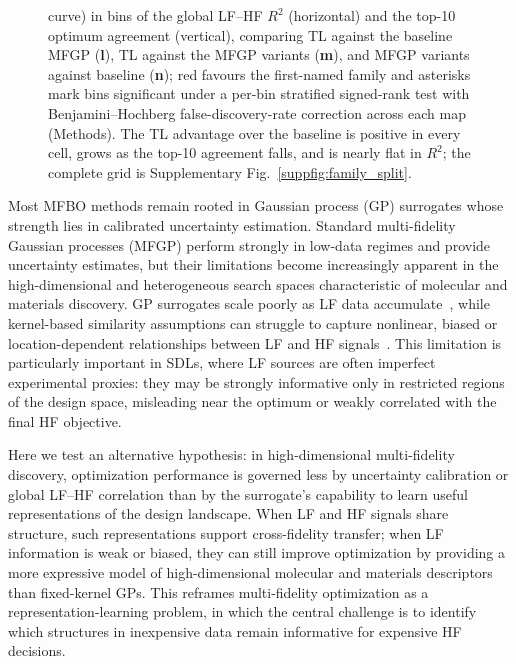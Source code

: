 \documentclass[11pt,a4paper]{article}%
\begin{document}
\begin{figure}[tp]
{curve) in bins of the global LF--HF $R^2$ (horizontal) and the top-10 optimum agreement
(vertical), comparing TL against the baseline MFGP (\textbf{l}), TL
against the MFGP variants (\textbf{m}), and MFGP variants against baseline
(\textbf{n}); red favours the first-named family and asterisks mark bins significant
under a per-bin stratified signed-rank test with Benjamini--Hochberg
false-discovery-rate correction across each map (Methods). The TL
advantage over the baseline is positive in every cell, grows as the top-10 agreement
falls, and is nearly flat in $R^2$; the complete grid is Supplementary
Fig.~\ref{suppfig:family_split}.}
\label{fig:overview}\label{fig:final_regret}\label{fig:family_heatmap}
\end{figure}

Most MFBO methods remain rooted in Gaussian process (GP) surrogates whose strength lies in calibrated uncertainty estimation. Standard multi-fidelity Gaussian processes (MFGP) perform strongly in low-data regimes and provide uncertainty estimates, but their limitations become increasingly apparent
 in the high-dimensional and heterogeneous search spaces characteristic of molecular and materials discovery.  GP surrogates scale poorly as LF data accumulate~\citep{williams2006gaussian}, while kernel-based similarity assumptions can struggle to capture nonlinear, biased or location-dependent relationships between LF and HF signals~\citep{snoek2015scalable, seeger2004gaussian, perdikaris2017nonlinear}. This limitation is particularly important in SDLs, where LF sources are often imperfect experimental proxies: they may be strongly informative only in restricted regions of the design space, misleading near the optimum or weakly correlated with the final HF objective.

Here we test an alternative hypothesis: in high-dimensional multi-fidelity discovery, optimization performance is governed less by uncertainty calibration or global LF--HF correlation than by the surrogate's capability to learn useful representations of the design landscape. When LF and HF signals share structure, such representations support cross-fidelity transfer; when LF information is weak or biased, they can still improve optimization by providing a more expressive model of high-dimensional molecular and materials descriptors than fixed-kernel GPs. This reframes multi-fidelity optimization as a representation-learning problem, in which the central challenge is to identify which structures in inexpensive data remain informative for expensive HF decisions.
\end{document}
